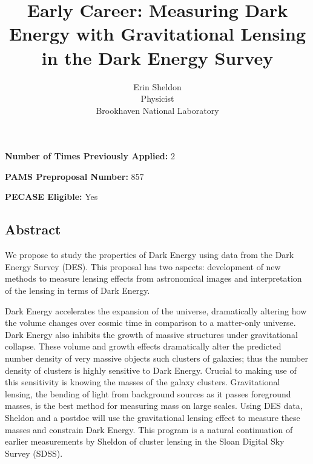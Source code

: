 \documentclass[12pt]{article}
\begin{document}
\vspace{3mm}
\noindent
{\bf Number of Times Previously Applied:} 2

\vspace{3mm}
\noindent
{\bf PAMS Preproposal Number:} 857


\vspace{3mm}
\noindent
{\bf PECASE Eligible:} Yes



\newpage

\thispagestyle{empty}

\newpage

\title{Early Career: Measuring Dark Energy with Gravitational Lensing in 
the Dark Energy Survey}
\author{Erin Sheldon\\
{\normalsize Physicist}\\
\normalsize{Brookhaven National Laboratory}}
\date{}
\maketitle

\thispagestyle{empty}
\begin{center}
\section*{Abstract}
\end{center}

We propose to study the properties of Dark Energy using data from the Dark
Energy Survey (DES). This proposal has two aspects: development of new methods
to measure lensing effects from astronomical images and interpretation of the
lensing in terms of Dark Energy.

Dark Energy accelerates the expansion of the universe, dramatically altering
how the volume changes over cosmic time in comparison to a matter-only
universe.  Dark Energy also inhibits the growth of massive structures under
gravitational collapse.  These volume and growth effects dramatically alter the
predicted number density of very massive objects such clusters of galaxies;
thus the number density of clusters is highly sensitive to Dark Energy.
Crucial to making use of this sensitivity is knowing the masses of the galaxy
clusters.  Gravitational lensing, the bending of light from background sources
as it passes foreground masses, is the best method for measuring mass on large
scales.  Using DES data, Sheldon and a postdoc will use the gravitational
lensing effect to measure these masses and constrain Dark Energy.  This program
is a natural continuation of earlier measurements by Sheldon of cluster lensing
in the Sloan Digital Sky Survey (SDSS).
\end{document}
